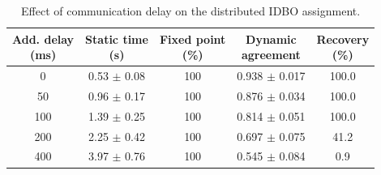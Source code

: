 \begin{table}[!t]
\centering
\footnotesize
\setlength{\tabcolsep}{1.8pt}
\caption{Effect of communication delay on the distributed IDBO assignment.}
\label{tab:idbo_delay_scalability}
\begin{tabular}{@{}ccccc@{}}
\hline\hline
\shortstack{Add. delay\\(ms)} & \shortstack{Static time\\(s)} &
\shortstack{Fixed point\\(\%)} & \shortstack{Dynamic\\agreement} &
\shortstack{Recovery\\(\%)} \\
\hline
0 & 0.53 $\pm$ 0.08 & 100 & 0.938 $\pm$ 0.017 & 100.0 \\
50 & 0.96 $\pm$ 0.17 & 100 & 0.876 $\pm$ 0.034 & 100.0 \\
100 & 1.39 $\pm$ 0.25 & 100 & 0.814 $\pm$ 0.051 & 100.0 \\
200 & 2.25 $\pm$ 0.42 & 100 & 0.697 $\pm$ 0.075 & 41.2 \\
400 & 3.97 $\pm$ 0.76 & 100 & 0.545 $\pm$ 0.084 & 0.9 \\
\hline
\end{tabular}
\end{table}
